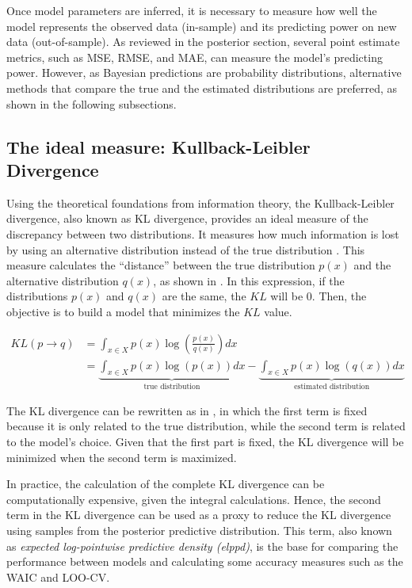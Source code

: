 Once model parameters are inferred, it is necessary to measure how well the model represents the observed data (in-sample) and its predicting power on new data (out-of-sample). As reviewed in the posterior section, several point estimate metrics, such as MSE, RMSE, and MAE, can measure the model's predicting power. However, as Bayesian predictions are probability distributions, alternative methods that compare the true and the estimated distributions are preferred, as shown in the following subsections. 

\subsection{The ideal measure: Kullback-Leibler Divergence }

Using the theoretical foundations from information theory, the Kullback-Leibler divergence, also known as KL divergence, provides an ideal measure of the discrepancy between two distributions. It measures how much information is lost by using an alternative distribution instead of the true distribution \citep{Lambert2018}. This measure calculates the “distance” between the true distribution $p(x)$ and the alternative distribution $q(x)$, as shown in . In this expression, if the distributions $p(x)$ and $q(x)$ are the same, the $KL$ will be 0. Then, the objective is to build a model that minimizes the $KL$ value.

\begin{align}\label{eq:kl_divergence}
    KL(p \rightarrow q) &= \int_{x \in X} p(x) \log\left(\frac{p(x)}{q(x)}\right) dx \\
    &= \underbrace{\int_{x \in X} p(x) \log(p(x)) dx}_{\text{true distribution}} - \underbrace{\int_{x \in X} p(x) \log(q(x)) dx}_{\text{estimated distribution}}\label{eq:kl_divergence_2} 
\end{align}

The KL divergence can be rewritten as in , in which the first term is fixed because it is only related to the true distribution, while the second term is related to the model's choice. Given that the first part is fixed, the KL divergence will be minimized when the second term is maximized. 

In practice, the calculation of the complete KL divergence can be computationally expensive, given the integral calculations. Hence, the second term in the KL divergence can be used as a proxy to reduce the KL divergence using samples from the posterior predictive distribution. This term, also known as \textit{expected log-pointwise predictive density (elppd)}, is the base for comparing the performance between models and calculating some accuracy measures such as the WAIC and LOO-CV.

